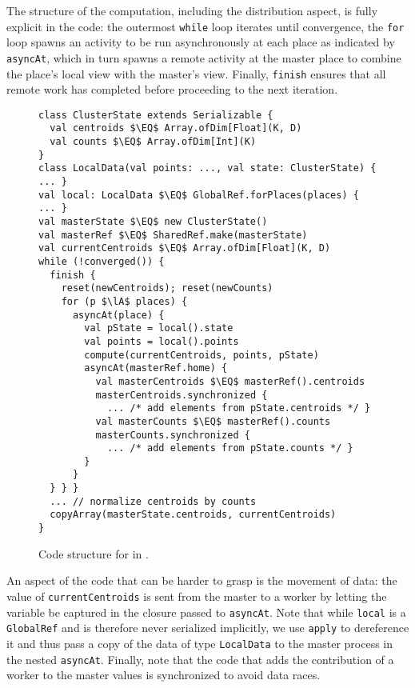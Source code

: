 The structure of the computation, including the distribution
aspect, is fully explicit in the code: the outermost \lstinline{while} loop
iterates until convergence, the \lstinline{for} loop spawns an activity to be run asynchronously at each place as indicated by \lstinline{asyncAt}, which in turn spawns a remote activity at the master place to combine the place's local view with the master's view.
Finally, \lstinline{finish} ensures that all remote work has completed before
proceeding to the next iteration.
\begin{figure}
\begin{lstlisting}
class ClusterState extends Serializable {
  val centroids $\EQ$ Array.ofDim[Float](K, D)
  val counts $\EQ$ Array.ofDim[Int](K)
}
class LocalData(val points: ..., val state: ClusterState) { ... }
val local: LocalData $\EQ$ GlobalRef.forPlaces(places) { ... }
val masterState $\EQ$ new ClusterState()
val masterRef $\EQ$ SharedRef.make(masterState)
val currentCentroids $\EQ$ Array.ofDim[Float](K, D)
while (!converged()) {
  finish {
    reset(newCentroids); reset(newCounts)
    for (p $\lA$ places) {
      asyncAt(place) {
        val pState = local().state
        val points = local().points
        compute(currentCentroids, points, pState)
        asyncAt(masterRef.home) {
          val masterCentroids $\EQ$ masterRef().centroids
          masterCentroids.synchronized {
            ... /* add elements from pState.centroids */ }
          val masterCounts $\EQ$ masterRef().counts
          masterCounts.synchronized {
            ... /* add elements from pState.counts */ }
        }
      }
  } } }
  ... // normalize centroids by counts
  copyArray(masterState.centroids, currentCentroids)
}
\end{lstlisting}
\caption{Code structure for \kmeans in \apgas.\label{fig:kmeansapgas}}
\end{figure}
An aspect of the code that can be harder to grasp is the movement of data: the
value of \lstinline{currentCentroids} is sent from the master to a worker by letting the variable be captured in the closure passed to \lstinline{asyncAt}.
Note that while \lstinline{local} is a
\lstinline{GlobalRef} and is therefore never serialized implicitly, we use
\lstinline{apply} to dereference it and thus pass a copy of the data of type
\lstinline{LocalData} to the master process in the nested \lstinline{asyncAt}.
Finally, note that the code that adds the contribution of a worker to the master values is synchronized to avoid data races.

